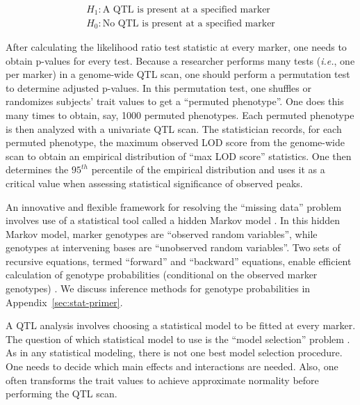\documentclass[oneside]{book}\usepackage[]{graphicx}\usepackage[]{color}
\begin{document}
\begin{eqnarray}
H_1: \text{A QTL is present at a specified marker}\nonumber \\
H_0: \text{No QTL is present at a specified marker}
\label{eq:qtl-hypotheses}
\end{eqnarray}








After calculating the likelihood ratio test statistic at every marker,
one needs to obtain p-values for every test. Because a researcher performs many
tests (\emph{i.e.}, one per marker) in a genome-wide QTL scan, one should perform
a permutation test to determine adjusted p-values. In this permutation test, one
shuffles or randomizes subjects' trait values to get a ``permuted phenotype''. One
does this many times to obtain, say, 1000 permuted phenotypes. Each permuted phenotype
is then analyzed with a univariate QTL scan. The statistician records, for
each permuted phenotype, the maximum observed LOD score from the genome-wide scan to
obtain an empirical distribution of ``max LOD score'' statistics. One then
determines the $95^{th}$ percentile of the empirical distribution and uses it as 
a critical value when assessing statistical significance of observed peaks.





An innovative and flexible framework for resolving the ``missing data'' problem involves
use of a statistical tool called a 
hidden Markov model \citep{broman2009guide, broman2006use}. 
In this hidden Markov model, marker genotypes are ``observed random variables'', 
while genotypes at intervening bases are ``unobserved random variables''. 
Two sets of recursive equations, termed ``forward'' and ``backward'' equations,
enable efficient calculation of genotype probabilities
(conditional on the observed marker genotypes) \citep{baum1970maximization}.
We discuss inference methods for genotype probabilities in Appendix~\ref{sec:stat-primer}.



A QTL analysis involves choosing a statistical model to be fitted at every marker.
The question of which statistical model to use is the
``model selection'' problem \citep{broman2009guide}.
As in any statistical modeling, there is not one best model selection procedure.
One needs to decide which main effects and interactions are needed.
Also, one often transforms the trait values to achieve approximate
normality before performing the QTL scan. 
\end{document}
